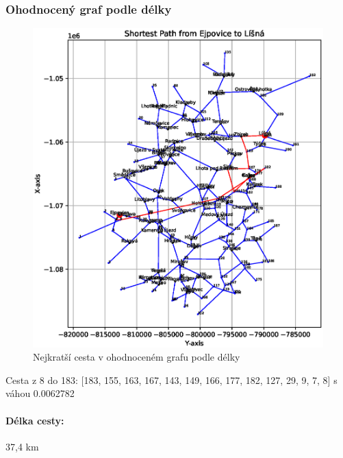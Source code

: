 \subsubsection*{Ohodnocený graf podle délky}
\begin{figure}[H]
    \centering
    \includegraphics[width=\textwidth]{images/Ejpovice_length_weight.eps}
    \caption{Nejkratší cesta v ohodnoceném grafu podle délky}
\end{figure}
Cesta z 8 do 183: [183, 155, 163, 167, 143, 149, 166, 177, 182, 127, 29, 9, 7, 8] s váhou 0.0062782
\paragraph{Délka cesty:} 37,4 km
